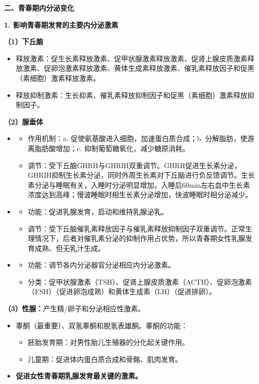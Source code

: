 \begin{keybox}
\textbf{二、青春期内分泌变化}

\textbf{1. 影响青春期发育的主要内分泌激素}

\textbf{（1）下丘脑}
\begin{itemize}[leftmargin=*]
    \item 释放激素：促生长素释放激素、促甲状腺激素释放激素、促肾上腺皮质激素释放激素、促卵泡激素释放激素、黄体生成素释放激素、催乳素释放因子和促黑（素细胞）激素释放激素。
    \item 释放抑制激素：生长抑素、催乳素释放抑制因子和促黑（素细胞）激素释放抑制因子。
\end{itemize}

\textbf{（2）腺垂体}
\begin{itemize}[leftmargin=*]
    \item {}
    \begin{itemize}[leftmargin=*]
        \item 作用机制：a. 促使氨基酸进入细胞，加速蛋白质合成；b. 分解脂肪，使游离脂肪酸增加；c. 抑制葡萄糖氧化，减少糖原消耗。
        \item 调节：受下丘脑GHRH与GHRIH双重调节。GHRH促进生长素分泌，GHRIH抑制生长素分泌，同时外周生长素对下丘脑进行负反馈调节。生长素分泌与睡眠有关，入睡时分泌明显增加，入睡后60min左右血中生长素浓度达到高峰；慢波睡眠时相生长素分泌增加，快波睡眠时相分泌减少。
    \end{itemize}
    \item {}
    \begin{itemize}[leftmargin=*]
        \item 功能：促进乳腺发育，启动和维持乳腺泌乳。
        \item 调节：受下丘脑催乳素释放因子与催乳素释放抑制因子双重调节。正常生理情况下，后者对催乳素分泌的抑制作用占优势，所以青春期女性乳腺发育成熟、但无乳汁生成。
    \end{itemize}
    \item {}
    \begin{itemize}[leftmargin=*]
        \item 功能：调节各内分泌器官分泌相应内分泌激素。
        \item 分类：促甲状腺激素（TSH）、促肾上腺皮质激素（ACTH）、促卵泡激素（FSH）（促进卵泡成熟）和黄体生成素（LH）（促进排卵）。
    \end{itemize}
\end{itemize}

\textbf{（3）性腺：}产生精/卵子和分泌相应性激素。
\begin{itemize}[leftmargin=*]
    \item {}睾酮（最重要）、双氢睾酮和脱氢表雄酮。睾酮的功能：
    \begin{itemize}[leftmargin=*]
        \item 胚胎发育期：对男性胎儿生殖器的分化起关键作用。
        \item 儿童期：促进体内蛋白质合成和骨骼、肌肉发育。
    \end{itemize}
    \item {}\textbf{促进女性青春期乳腺发育最关键的激素。}
\end{itemize}


\end{keybox}
